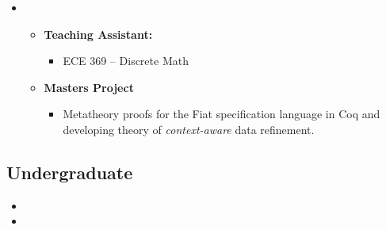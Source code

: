 \documentclass[10pt,a4paper,sans]{moderncv}        %
\begin{document}
\begin{itemize}

\item{}

  \begin{itemize}
  \item{\textbf{Teaching Assistant:}}
    \begin{itemize}
    \item ECE 369 -- Discrete Math
    \end{itemize}
  \item{
      \textbf{Masters Project}
      \begin{itemize}
      \item \parbox{0.75\linewidth}{Metatheory proofs for the Fiat
          specification language in Coq and developing theory of
          \emph{context-aware} data refinement. }
      \end{itemize}
    }
  \end{itemize}





\end{itemize}

\subsection{Undergraduate}

\vspace{3pt}

\begin{itemize}

\item{}

\item{}  %

\end{itemize}

\vspace{2pt}
\end{document}
